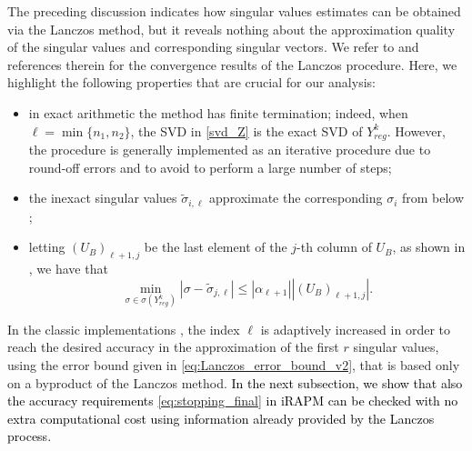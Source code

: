 \documentclass[pdflatex,sn-mathphys-num]{sn-jnl}
\numberwithin{equation}{section}%
\newcommand{\Yck}{{Y_{reg}^k}}
\newcommand{\REV}[1]{\textcolor{black}{#1}}
\theoremstyle{thmstyleone}%
\theoremstyle{thmstyletwo}%
\theoremstyle{thmstylethree}%
\begin{document}
The preceding discussion indicates how singular values estimates can be obtained via the Lanczos method, but it reveals nothing about the approximation quality of the singular values and corresponding singular vectors. 
We refer to \cite[Section 10.4]{golub2013matrix} and references therein for the convergence results of the Lanczos procedure. Here, we highlight the following properties that are crucial for our analysis: 
\begin{itemize}
    \item in exact arithmetic the method  has finite termination; indeed, when $\ell =\min\{n_1,n_2\}$, the SVD in \eqref{svd_Z} is the exact SVD of $\Yck$. However, the procedure is generally implemented as an iterative procedure due to round-off errors and to avoid to perform a large number of steps;
    \item the inexact singular values $\tilde \sigma_{i,\ell}$ approximate the corresponding $\sigma_i$ from below \cite[Th.  6.4]{saad2011numerical};
    \item letting $(U_B)_{\ell +1, j}$ be the last element of the $j$-th column of $U_B$,  as shown in \cite{larsen1998lanczos}, we have that 
    \begin{equation} \label{eq:Lanczos_error_bound_v2}
        \min_{\sigma \in \sigma(\Yck)} | \sigma - \tilde \sigma_{j, \ell} | \le | \alpha_{\ell+1} | |(U_B)_{\ell +1, j}|.
    \end{equation}
\end{itemize}
In the classic implementations \cite{larsen1998lanczos}, the index $\ell$ is adaptively increased in order to reach the desired accuracy in the approximation of the first $r$ singular values, using the error bound given in \eqref{eq:Lanczos_error_bound_v2}, that is  based only on a byproduct of the Lanczos method.
\REV{In  the next subsection, we show  that also the accuracy requirements 
\eqref{eq:stopping_final} in iRAPM can be checked with no extra computational cost using information already provided by the Lanczos process.
}
\end{document}
